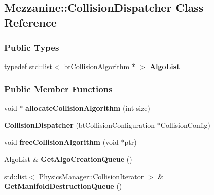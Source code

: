 \hypertarget{classMezzanine_1_1CollisionDispatcher}{
\subsection{Mezzanine::CollisionDispatcher Class Reference}
\label{classMezzanine_1_1CollisionDispatcher}
}
\subsubsection*{Public Types}
\begin{DoxyCompactItemize}
\item 
\hypertarget{classMezzanine_1_1CollisionDispatcher_a0fd318aa1057f8b48f79b28e0fc3783f}{
typedef std::list$<$ btCollisionAlgorithm $\ast$ $>$ {\bfseries AlgoList}}
\label{classMezzanine_1_1CollisionDispatcher_a0fd318aa1057f8b48f79b28e0fc3783f}

\end{DoxyCompactItemize}
\subsubsection*{Public Member Functions}
\begin{DoxyCompactItemize}
\item 
\hypertarget{classMezzanine_1_1CollisionDispatcher_ae384ed995cba028d6e7bd57098d2f67d}{
void $\ast$ {\bfseries allocateCollisionAlgorithm} (int size)}
\label{classMezzanine_1_1CollisionDispatcher_ae384ed995cba028d6e7bd57098d2f67d}

\item 
\hypertarget{classMezzanine_1_1CollisionDispatcher_a9aa6ea6e6c0aaa308a5693062ccf6568}{
{\bfseries CollisionDispatcher} (btCollisionConfiguration $\ast$CollisionConfig)}
\label{classMezzanine_1_1CollisionDispatcher_a9aa6ea6e6c0aaa308a5693062ccf6568}

\item 
\hypertarget{classMezzanine_1_1CollisionDispatcher_a7f5296daba765a8b1c258239f519c021}{
void {\bfseries freeCollisionAlgorithm} (void $\ast$ptr)}
\label{classMezzanine_1_1CollisionDispatcher_a7f5296daba765a8b1c258239f519c021}

\item 
\hypertarget{classMezzanine_1_1CollisionDispatcher_accdd6570d86d41be9bc1672254d15ff9}{
AlgoList \& {\bfseries GetAlgoCreationQueue} ()}
\label{classMezzanine_1_1CollisionDispatcher_accdd6570d86d41be9bc1672254d15ff9}

\item 
\hypertarget{classMezzanine_1_1CollisionDispatcher_aa401c7c3c50f72578df60609f9cce02e}{
std::list$<$ \hyperlink{classMezzanine_1_1PhysicsManager_a930a032df1bf01b9f93ba4e815a433c2}{PhysicsManager::CollisionIterator} $>$ \& {\bfseries GetManifoldDestructionQueue} ()}
\label{classMezzanine_1_1CollisionDispatcher_aa401c7c3c50f72578df60609f9cce02e}

\end{DoxyCompactItemize}
